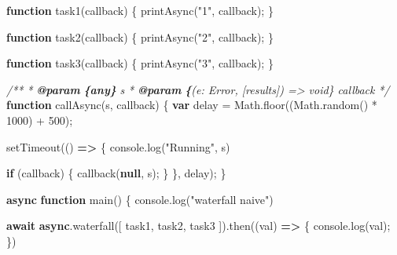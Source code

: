 \documentclass[11pt]{article}
\newenvironment{Shaded}{}{}
\newcommand{\KeywordTok}[1]{\textcolor[rgb]{0.00,0.44,0.13}{\textbf{{#1}}}}
\newcommand{\DecValTok}[1]{\textcolor[rgb]{0.25,0.63,0.44}{{#1}}}
\newcommand{\StringTok}[1]{\textcolor[rgb]{0.25,0.44,0.63}{{#1}}}
\newcommand{\CommentTok}[1]{\textcolor[rgb]{0.38,0.63,0.69}{\textit{{#1}}}}
\newcommand{\FunctionTok}[1]{\textcolor[rgb]{0.02,0.16,0.49}{{#1}}}
\newcommand{\NormalTok}[1]{{#1}}
\newcommand{\AnnotationTok}[1]{\textcolor[rgb]{0.38,0.63,0.69}{\textbf{\textit{{#1}}}}}
\newcommand{\CommentVarTok}[1]{\textcolor[rgb]{0.38,0.63,0.69}{\textbf{\textit{{#1}}}}}
\newcommand{\ControlFlowTok}[1]{\textcolor[rgb]{0.00,0.44,0.13}{\textbf{{#1}}}}
\newcommand{\OperatorTok}[1]{\textcolor[rgb]{0.40,0.40,0.40}{{#1}}}
\newcommand{\BuiltInTok}[1]{{#1}}
\newcommand{\PreprocessorTok}[1]{\textcolor[rgb]{0.74,0.48,0.00}{{#1}}}
\begin{document}
\begin{Shaded}
\begin{Highlighting}[]
\KeywordTok{function} \FunctionTok{task1}\NormalTok{(callback) \{}
    \FunctionTok{printAsync}\NormalTok{(}\StringTok{"1"}\OperatorTok{,}\NormalTok{ callback)}\OperatorTok{;}
\NormalTok{\}}

\KeywordTok{function} \FunctionTok{task2}\NormalTok{(callback) \{}
    \FunctionTok{printAsync}\NormalTok{(}\StringTok{"2"}\OperatorTok{,}\NormalTok{ callback)}\OperatorTok{;}
\NormalTok{\}}

\KeywordTok{function} \FunctionTok{task3}\NormalTok{(callback) \{}
    \FunctionTok{printAsync}\NormalTok{(}\StringTok{"3"}\OperatorTok{,}\NormalTok{ callback)}\OperatorTok{;}
\NormalTok{\}}

\CommentTok{/**}
\CommentTok{ * }\AnnotationTok{@param}\CommentTok{ }\CommentVarTok{\{any\}}\CommentTok{ s }
\CommentTok{ * }\AnnotationTok{@param}\CommentTok{ }\CommentVarTok{\{}\CommentTok{(e: Error, [results]) =\textgreater{} void\} callback }
\CommentTok{ */}
\KeywordTok{function} \FunctionTok{callAsync}\NormalTok{(s}\OperatorTok{,}\NormalTok{ callback) \{}
    \KeywordTok{var}\NormalTok{ delay }\OperatorTok{=} \BuiltInTok{Math}\OperatorTok{.}\FunctionTok{floor}\NormalTok{((}\BuiltInTok{Math}\OperatorTok{.}\FunctionTok{random}\NormalTok{() }\OperatorTok{*} \DecValTok{1000}\NormalTok{) }\OperatorTok{+} \DecValTok{500}\NormalTok{)}\OperatorTok{;}

    \PreprocessorTok{setTimeout}\NormalTok{(() }\KeywordTok{=\textgreater{}}\NormalTok{ \{}
        \BuiltInTok{console}\OperatorTok{.}\FunctionTok{log}\NormalTok{(}\StringTok{"Running"}\OperatorTok{,}\NormalTok{ s)}

        \ControlFlowTok{if}\NormalTok{ (callback) \{}
            \FunctionTok{callback}\NormalTok{(}\KeywordTok{null}\OperatorTok{,}\NormalTok{ s)}\OperatorTok{;}
\NormalTok{        \}}
\NormalTok{    \}}\OperatorTok{,}\NormalTok{ delay)}\OperatorTok{;}
\NormalTok{\}}

\KeywordTok{async} \KeywordTok{function} \FunctionTok{main}\NormalTok{() \{}
    \BuiltInTok{console}\OperatorTok{.}\FunctionTok{log}\NormalTok{(}\StringTok{"waterfall naive"}\NormalTok{)}

    \ControlFlowTok{await} \KeywordTok{async}\OperatorTok{.}\FunctionTok{waterfall}\NormalTok{([}
\NormalTok{        task1}\OperatorTok{,}
\NormalTok{        task2}\OperatorTok{,}
\NormalTok{        task3}
\NormalTok{    ])}\OperatorTok{.}\FunctionTok{then}\NormalTok{((val) }\KeywordTok{=\textgreater{}}\NormalTok{ \{}
        \BuiltInTok{console}\OperatorTok{.}\FunctionTok{log}\NormalTok{(val)}\OperatorTok{;}
\NormalTok{    \})}


\end{Highlighting}
\end{Shaded}
\end{document}
